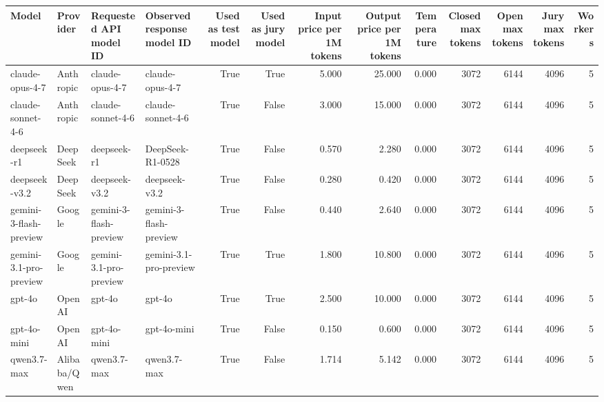 \begin{tabular}{llllrrrrrrrrr}
\toprule
Model & Provider & Requested API model ID & Observed response model ID & Used as test model & Used as jury model & Input price per 1M tokens & Output price per 1M tokens & Temperature & Closed max tokens & Open max tokens & Jury max tokens & Workers \\
\midrule
claude-opus-4-7 & Anthropic & claude-opus-4-7 & claude-opus-4-7 & True & True & 5.000 & 25.000 & 0.000 & 3072 & 6144 & 4096 & 5 \\
claude-sonnet-4-6 & Anthropic & claude-sonnet-4-6 & claude-sonnet-4-6 & True & False & 3.000 & 15.000 & 0.000 & 3072 & 6144 & 4096 & 5 \\
deepseek-r1 & DeepSeek & deepseek-r1 & DeepSeek-R1-0528 & True & False & 0.570 & 2.280 & 0.000 & 3072 & 6144 & 4096 & 5 \\
deepseek-v3.2 & DeepSeek & deepseek-v3.2 & deepseek-v3.2 & True & False & 0.280 & 0.420 & 0.000 & 3072 & 6144 & 4096 & 5 \\
gemini-3-flash-preview & Google & gemini-3-flash-preview & gemini-3-flash-preview & True & False & 0.440 & 2.640 & 0.000 & 3072 & 6144 & 4096 & 5 \\
gemini-3.1-pro-preview & Google & gemini-3.1-pro-preview & gemini-3.1-pro-preview & True & True & 1.800 & 10.800 & 0.000 & 3072 & 6144 & 4096 & 5 \\
gpt-4o & OpenAI & gpt-4o & gpt-4o & True & True & 2.500 & 10.000 & 0.000 & 3072 & 6144 & 4096 & 5 \\
gpt-4o-mini & OpenAI & gpt-4o-mini & gpt-4o-mini & True & False & 0.150 & 0.600 & 0.000 & 3072 & 6144 & 4096 & 5 \\
qwen3.7-max & Alibaba/Qwen & qwen3.7-max & qwen3.7-max & True & False & 1.714 & 5.142 & 0.000 & 3072 & 6144 & 4096 & 5 \\
\bottomrule
\end{tabular}

